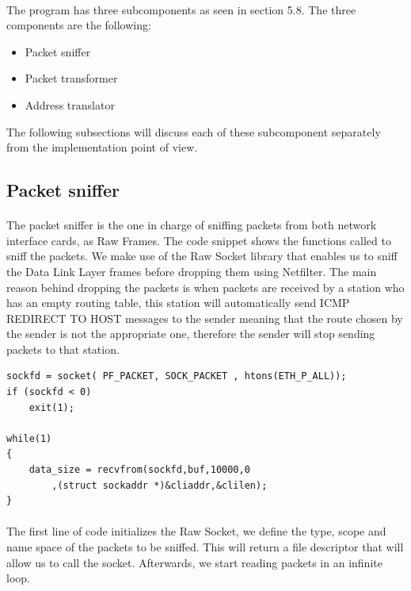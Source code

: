 \documentclass[12pt,a4paper,final]{report}
\begin{document}
\paragraph{}
The program has three subcomponents as seen in section 5.8. The three components are the following:
\begin{itemize}
\item Packet sniffer
\item Packet transformer
\item Address translator
\end{itemize}
The following subsections will discuss each of these subcomponent separately from the implementation point of view.

\subsection{Packet sniffer}
\paragraph{}
The packet sniffer is the one in charge of sniffing packets from both network interface cards, as Raw Frames. The code snippet shows the functions called to sniff the packets. We make use of the Raw Socket library that enables us to sniff the Data Link Layer frames before dropping them using Netfilter.
The main reason behind dropping the packets is when packets are received by a station who has an empty routing table, this station will automatically send ICMP REDIRECT TO HOST messages to the sender meaning that the route chosen by the sender is not the appropriate one, therefore the sender will stop sending packets to that station.
\newpage
\begin{singlespacing}
\begin{lstlisting}
sockfd = socket( PF_PACKET, SOCK_PACKET , htons(ETH_P_ALL));
if (sockfd < 0)
	exit(1);
	
while(1)
{
	data_size = recvfrom(sockfd,buf,10000,0
		,(struct sockaddr *)&cliaddr,&clilen);
}

\end{lstlisting}
\end{singlespacing}
\paragraph{}
The first line of code initializes the Raw Socket, we define the type, scope and name space of the packets to be sniffed. This will return a file descriptor that will allow us to call the socket. Afterwards, we start reading packets in an infinite loop.
\end{document}
